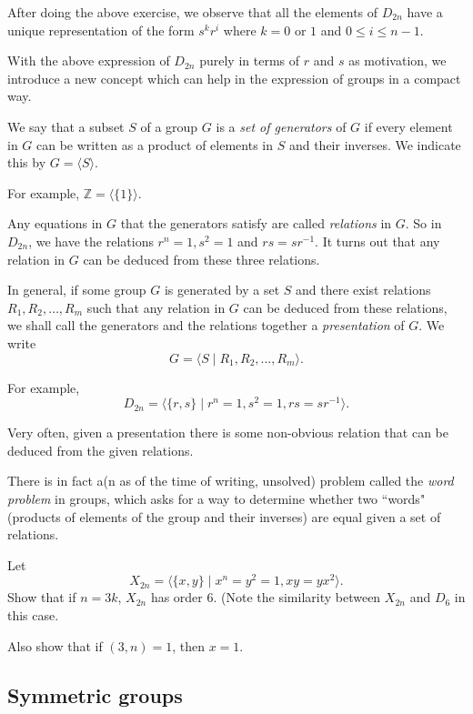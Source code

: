 After doing the above exercise, we observe that all the elements of $D_{2n}$ have a unique representation of the form $s^kr^i$ where $k=0\text{ or }1$ and $0\leq i\leq n-1$.

\vspace{4mm}
With the above expression of $D_{2n}$ purely in terms of $r$ and $s$ as motivation, we introduce a new concept which can help in the expression of groups in a compact way.
\begin{definition}
We say that a subset $S$ of a group $G$ is a \textit{set of generators} of $G$ if every element in $G$ can be written as a product of elements in $S$ and their inverses. We indicate this by $G=\langle S\rangle$. 
\end{definition}

For example, $\mathbb{Z}=\langle\{1\}\rangle$.

Any equations in $G$ that the generators satisfy are called \textit{relations} in $G$. So in $D_{2n}$, we have the relations $r^n=1, s^2=1$ and $rs=sr^{-1}$. It turns out that any relation in $G$ can be deduced from these three relations.

In general, if some group $G$ is generated by a set $S$ and there exist relations $R_1,R_2,\ldots,R_m$ such that any relation in $G$ can be deduced from these relations, we shall call the generators and the relations together a \textit{presentation} of $G$. We write $$G=\langle S\mid R_1, R_2,\ldots, R_m\rangle.$$

For example,
$$D_{2n}=\langle\{r,s\}\mid r^n=1, s^2=1, rs=sr^{-1}\rangle.$$

Very often, given a presentation there is some non-obvious relation that can be deduced from the given relations.

There is in fact a(n as of the time of writing, unsolved) problem called the \textit{word problem} in groups, which asks for a way to determine whether two ``words" (products of elements of the group and their inverses) are equal given a set of relations.

\begin{exercise}
    Let
    $$X_{2n}=\langle\{x,y\}\mid x^n=y^2=1, xy=yx^2\rangle.$$
    Show that if $n=3k$, $X_{2n}$ has order $6$. (Note the similarity between $X_{2n}$ and $D_6$ in this case. 
    
    Also show that if $(3,n)=1$, then $x=1$.
\end{exercise}

\subsection{Symmetric groups}

